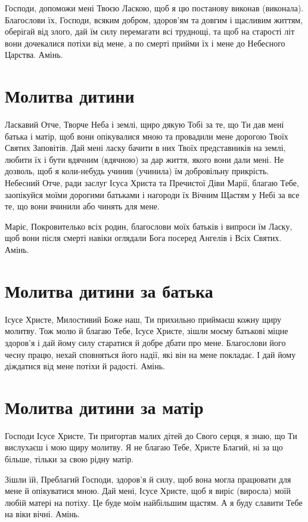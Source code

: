 \documentclass[chapters.tex]{subfiles}
\begin{document}
Господи, допоможи мені Твоєю Ласкою, щоб я цю постанову виконав (виконала). Благослови їх, Господи, всяким добром, здоров’ям та довгим і щасливим життям, оберігай від злого, дай їм силу перемагати всі труднощі, та щоб на старості літ вони дочекалися потіхи від мене, а по смерті прийми їх і мене до Небесного Царства. Амінь.

\section{Молитва дитини}
Ласкавий Отче, Творче Неба і землі, щиро дякую Тобі за те, що Ти дав мені батька і матір, щоб вони опікувалися мною та провадили мене дорогою Твоїх Святих Заповітів. Дай мені ласку бачити в них Твоїх представників на землі, любити їх і бути вдячним (вдячною) за дар життя, якого вони дали мені. Не дозволь, щоб я коли-небудь учинив (учинила) їм добровільну прикрість. Небесний Отче, ради заслуг Ісуса Христа та Пречистої Діви Марії, благаю Тебе, заопікуйся моїми дорогими батьками і нагороди їх Вічним Щастям у Небі за все те, що вони вчинили або чинять для мене.

Маріє, Покровителько всіх родин, благослови моїх батьків і випроси їм Ласку, щоб вони після смерті навіки оглядали Бога посеред Ангелів і Всіх Святих. Амінь.

\section{Молитва дитини за батька}
Ісусе Христе, Милостивий Боже наш, Ти прихильно приймаєш кожну щиру молитву. Тож молю й благаю Тебе, Ісусе Христе, зішли моєму батькові міцне здоров’я і дай йому силу старатися й добре дбати про мене. Благослови його чесну працю, нехай сповняться його надії, які він на мене покладає. І дай йому діждатися від мене потіхи й радості. Амінь.

\section{Молитва дитини за матір}
Господи Ісусе Христе, Ти пригортав малих дітей до Свого серця, я знаю, що Ти вислухаєш і мою щиру молитву. Я не благаю Тебе, Христе Благий, ні за що більше, тільки за свою рідну матір.

Зішли їй, Преблагий Господи, здоров’я й силу, щоб вона могла працювати для мене й опікуватися мною. Дай мені, Ісусе Христе, щоб я виріс (виросла) моїй любій матері на потіху. Це буде моїм найбільшим щастям. А я буду славити Тебе на віки вічні. Амінь.
\end{document}
